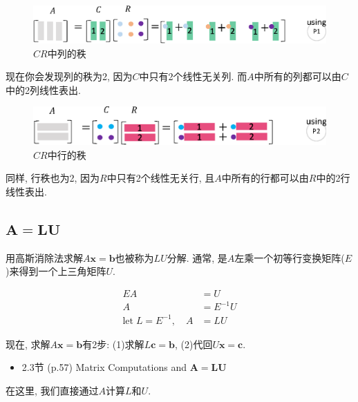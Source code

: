 \documentclass[letterpaper]{article}
\begin{document}
\begin{figure}[H]
  \centering
  \includegraphics[scale=0.8]{CR1.eps}
  \caption{$CR$中列的秩}
\end{figure}

现在你会发现列的秩为2, 因为$C$中只有2个线性无关列. 
而$A$中所有的列都可以由$C$中的2列线性表出. 

\begin{figure}[H]
  \centering
  \includegraphics[scale=0.8]{CR2.eps}
  \caption{$CR$中行的秩}
\end{figure}

同样, 行秩也为2, 因为$R$中只有2个线性无关行, 且$A$中所有的行都可以由$R$中的2行线性表出. 

\subsection{$\boldsymbol{A=LU}$}

用高斯消除法求解$A\bm{x}=\bm{b}$也被称为$LU$分解. 
通常, 是$A$左乘一个初等行变换矩阵($E$)来得到一个上三角矩阵$U$. 

\begin{align*}
  EA &= U\\
  A &= E^{-1}U\\
\text{let} \; L = E^{-1}, \quad  A &= LU
\end{align*}

现在, 求解$A\bm{x}=\bm{b}$有2步: (1)求解$L\bm{c}=\bm{b}$, (2)代回$U\bm{x}=\bm{c}$. 


\begin{itemize}
  \item 2.3节 (p.57) Matrix Computations and $\bm{A=LU}$
\end{itemize}

在这里, 我们直接通过$A$计算$L$和$U$.
\end{document}
